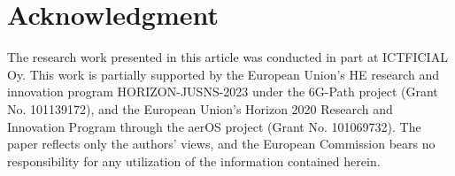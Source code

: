 \documentclass[conference]{IEEEtran}
\begin{document}
\section*{Acknowledgment}
The research work presented in this article was conducted in part at ICTFICIAL Oy. This work is partially supported by the European Union’s HE research and innovation program HORIZON-JUSNS-2023 under the 6G-Path project (Grant No. 101139172), and the European Union’s Horizon 2020 Research and Innovation Program through the aerOS project (Grant No. 101069732). The paper reflects only the authors’ views, and the European Commission bears no responsibility for any utilization of the information contained herein.



\end{document}
